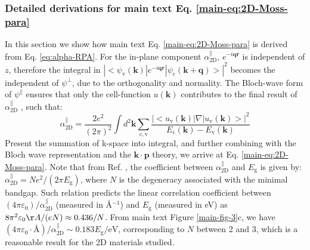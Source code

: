 \documentclass[manuscript=suppinfo,email=true,hyperref=true,keywords=false]{achemso}
\begin{document}
\subsubsection{Detailed derivations for main text Eq. \ref{main-eq:2D-Moss-para}}
\label{sssec:theory-1}

In this section we show how main text Eq. \ref{main-eq:2D-Moss-para}
is derived from Eq. \ref{eq:alpha-RPA}. For the in-plane component
$\alpha_{\mathrm{2D}}^{\parallel}$, $e^{-i\mathbf{qr}}$ is independent
of $z$, therefore the integral in
$|<\psi_{\mathrm{v}}(\mathbf{k})|e^{-i\mathbf{q}\mathbf{r}}|\psi_{\mathrm{c}}(\mathbf{k+q})>|^{2}$
becomes the independent of $\psi^{\perp}$, due to the orthogonality
and normality. The Bloch-wave form of $\psi^{\parallel}$ ensures that
only the cell-function $u(\mathbf{k})$ contributes to the final result
of $\alpha^{\parallel}_{\mathrm{2D}}$ \cite{davies_physics_1997}, such
that:
\begin{equation}
  \label{eq:alpha_para_RPA}
  \alpha_{\mathrm{2D}}^{\parallel} = \frac{2e^{2}}
  {(2 \pi)^{2}} \int d^{2}\mathbf{k} \sum_{\mathrm{c, v}}
  \frac{|<u_{\mathrm{v}}(\mathbf{k})|\nabla|u_{\mathrm{v}}(\mathbf{k})>|^{2}}
  {E_{\mathrm{c}}(\mathbf{k}) - E_{\mathrm{v}}(\mathbf{k})}
\end{equation}
Present the summation of k-space into integral, and further combining
with the Bloch wave representation and the
$\mathbf{k} \cdot \mathbf{p}$ theory\cite{Jiang_2017_Eg_Eb}, we arrive
at Eq. \ref{main-eq:2D-Moss-para}. Note that from
Ref. , the coefficient between
$\alpha^{\parallel}_{\mathrm{2D}}$ and $E_{\mathrm{g}}$ is given by:
$\alpha_{\mathrm{2D}}^{\parallel} = N e^{2}/(2\pi E_{\mathrm{g}})$,
where $N$ is the degeneracy associated with the minimal bandgap. Such
relation predicts the linear correlation coefficient between
$(4\pi \varepsilon_{0})/\alpha^{\parallel}_{\mathrm{2D}}$ (measured in
\AA{}$^{-1}$) and $E_{\mathrm{g}}$ (measured in eV) as
$8 \pi^{2} \varepsilon_{0} \AA{} / (e N) \approx 0.436 / N$. From main
text Figure \ref{main-fig-3}c, we have
$(4 \pi \varepsilon_{0}\cdot \text{\AA{}})/\alpha_{\mathrm{2D}}^{\parallel}
\sim{} 0.183 E_{\mathrm{g}}/ \mathrm{eV}$, corresponding to $N$
between 2 and 3, which is a reasonable result for the 2D materials
studied.
\end{document}
